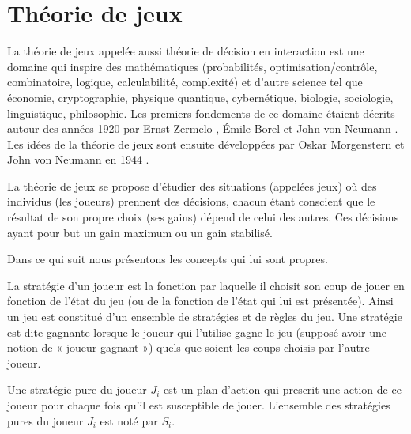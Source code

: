 
\section{Théorie de jeux}

La théorie de jeux appelée aussi théorie de décision en interaction est une domaine qui inspire des mathématiques (probabilités, optimisation/contrôle, combinatoire, logique, calculabilité, complexité) et d’autre science tel que économie, cryptographie, physique quantique, cybernétique, biologie, sociologie, linguistique, philosophie.
Les premiers fondements de ce domaine étaient décrits autour des années 1920 par Ernst Zermelo \citep{depriester1913ernst}, Émile Borel \citep{EmileBorel1921} et John von Neumann \citep{depriester1928jonvon}. Les idées de la théorie de jeux sont ensuite développées par Oskar Morgenstern et John von Neumann en 1944 \citep{depriester1944jo}.

La théorie de jeux se propose d'étudier des situations (appelées jeux) où des individus (les joueurs) prennent des décisions, chacun étant conscient que le résultat de son propre choix (ses gains) dépend de celui des autres. Ces décisions ayant pour but un gain maximum ou un gain stabilisé.

Dans ce qui suit nous présentons les concepts qui lui sont propres.

\begin{definition}[Stratégie]
	La stratégie d’un joueur est la fonction par laquelle il choisit son coup de jouer en fonction de l’état du jeu (ou de la fonction de l’état qui lui est présentée). Ainsi un jeu est constitué d'un ensemble de stratégies et de règles du jeu.  Une stratégie est dite gagnante lorsque le joueur qui l’utilise gagne le jeu (supposé avoir une notion de « joueur gagnant ») quels que soient les coups choisis par l’autre joueur.	
\end{definition}

\begin{definition}
	Une stratégie pure du joueur $J_i$ est un plan d’action qui prescrit une action de ce joueur pour chaque fois qu’il est susceptible de jouer. L’ensemble des stratégies pures du joueur $J_i$ est noté par $S_i$.
\end{definition}

